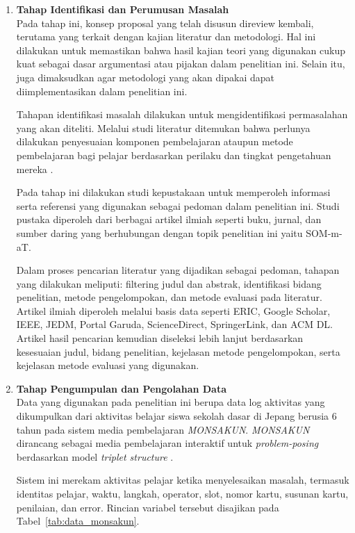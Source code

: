 \begin{enumerate}
    \item \textbf{Tahap Identifikasi dan Perumusan Masalah} \\
    Pada tahap ini, konsep proposal yang telah disusun direview kembali, terutama yang terkait dengan kajian literatur dan metodologi. Hal ini dilakukan untuk memastikan bahwa hasil kajian teori yang digunakan cukup kuat sebagai dasar argumentasi atau pijakan dalam penelitian ini. Selain itu, juga dimaksudkan agar metodologi yang akan dipakai dapat diimplementasikan dalam penelitian ini.

    Tahapan identifikasi masalah dilakukan untuk mengidentifikasi permasalahan yang akan diteliti. Melalui studi literatur ditemukan bahwa perlunya dilakukan penyesuaian komponen pembelajaran ataupun metode pembelajaran bagi pelajar berdasarkan perilaku dan tingkat pengetahuan mereka \citep{Ahmad2015}. 

    Pada tahap ini dilakukan studi kepustakaan untuk memperoleh informasi serta referensi yang digunakan sebagai pedoman dalam penelitian ini. Studi pustaka diperoleh dari berbagai artikel ilmiah seperti buku, jurnal, dan sumber daring yang berhubungan dengan topik penelitian ini yaitu SOM-m-aT. 

    Dalam proses pencarian literatur yang dijadikan sebagai pedoman, tahapan yang dilakukan meliputi: filtering judul dan abstrak, identifikasi bidang penelitian, metode pengelompokan, dan metode evaluasi pada literatur. Artikel ilmiah diperoleh melalui basis data seperti ERIC, Google Scholar, IEEE, JEDM, Portal Garuda, ScienceDirect, SpringerLink, dan ACM DL. Artikel hasil pencarian kemudian diseleksi lebih lanjut berdasarkan kesesuaian judul, bidang penelitian, kejelasan metode pengelompokan, serta kejelasan metode evaluasi yang digunakan.

    \item \textbf{Tahap Pengumpulan dan Pengolahan Data} \\
    Data yang digunakan pada penelitian ini berupa data log aktivitas yang dikumpulkan dari aktivitas belajar siswa sekolah dasar di Jepang berusia 6 tahun pada sistem media pembelajaran \textit{MONSAKUN}. \textit{MONSAKUN} dirancang sebagai media pembelajaran interaktif untuk \textit{problem-posing} berdasarkan model \textit{triplet structure} \citep{Hirashima2014}. 

    Sistem ini merekam aktivitas pelajar ketika menyelesaikan masalah, termasuk identitas pelajar, waktu, langkah, operator, slot, nomor kartu, susunan kartu, penilaian, dan error. Rincian variabel tersebut disajikan pada Tabel~\ref{tab:data_monsakun}.
\end{enumerate}


